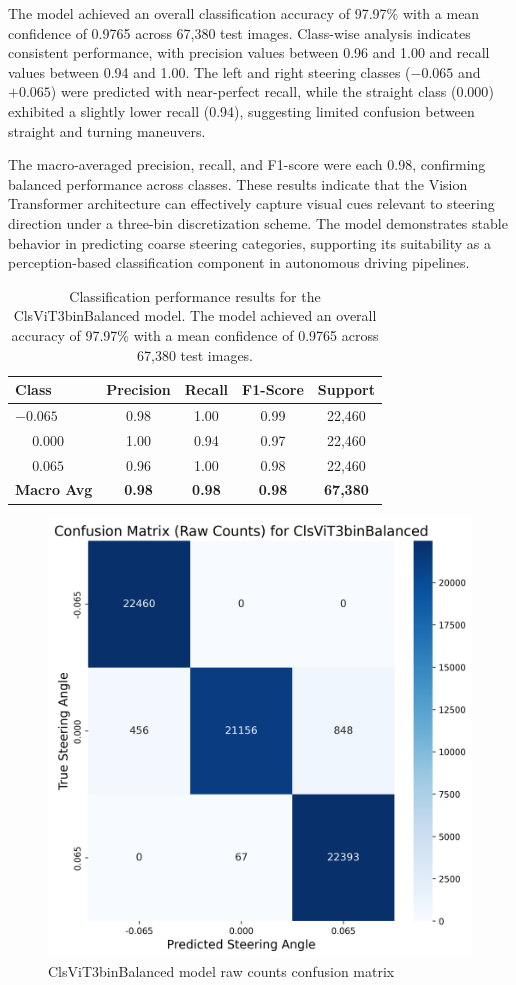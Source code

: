 The model achieved an overall classification accuracy of 97.97\% with a mean confidence of 0.9765 across 67,380 test images. Class-wise analysis indicates consistent performance, with precision values between 0.96 and 1.00 and recall values between 0.94 and 1.00. The left and right steering classes ($-0.065$ and $+0.065$) were predicted with near-perfect recall, while the straight class ($0.000$) exhibited a slightly lower recall (0.94), suggesting limited confusion between straight and turning maneuvers.

The macro-averaged precision, recall, and F1-score were each 0.98, confirming balanced performance across classes. These results indicate that the Vision Transformer architecture can effectively capture visual cues relevant to steering direction under a three-bin discretization scheme. The model demonstrates stable behavior in predicting coarse steering categories, supporting its suitability as a perception-based classification component in autonomous driving pipelines.

\begin{table}[htbp]
\centering
\begin{tabular}{@{}lcccc@{}}
\toprule
\textbf{Class} & \textbf{Precision} & \textbf{Recall} & \textbf{F1-Score} & \textbf{Support} \\
\midrule
$-0.065$ & 0.98 & 1.00 & 0.99 & 22,460 \\
$\phantom{-}0.000$ & 1.00 & 0.94 & 0.97 & 22,460 \\
$\phantom{-}0.065$ & 0.96 & 1.00 & 0.98 & 22,460 \\
\midrule
\textbf{Macro Avg} & \textbf{0.98} & \textbf{0.98} & \textbf{0.98} & \textbf{67,380} \\
\bottomrule
\end{tabular}
\caption{Classification performance results for the ClsViT3binBalanced model. The model achieved an overall accuracy of 97.97\% with a mean confidence of 0.9765 across 67,380 test images.}
\label{tab:clf_report_ClsViT3binBalanced}
\end{table}

\begin{figure}[H]
\centering
\includegraphics[width=0.65\linewidth]{Figures/Results/cm_raw_ClsViT3binBalanced.png}
\caption{ClsViT3binBalanced model raw counts confusion matrix}
\label{fig:cm_raw_ClsViT3binBalanced}
\end{figure}

